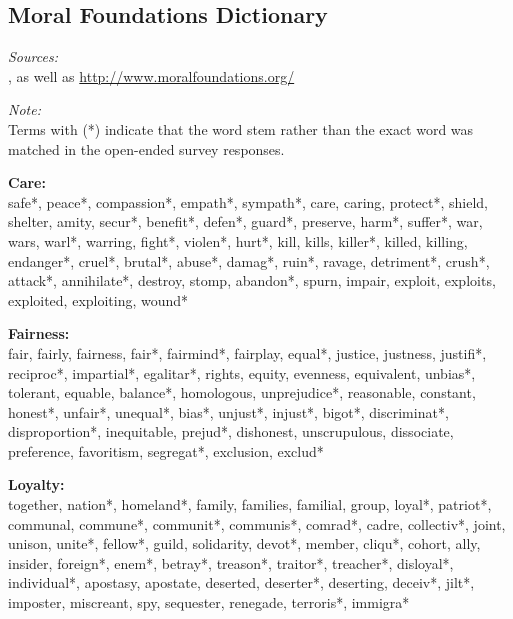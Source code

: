 \begin{flushleft}\footnotesize
\section{Moral Foundations Dictionary}\label{app:dict}
\textit{Sources:}\\
\citet{graham2009liberals}, as well as \url{http://www.moralfoundations.org/}
\vspace{.5cm}

\textit{Note:}\\
Terms with (*) indicate that the word stem rather than the exact word was matched in the open-ended survey responses.
\vspace{.5cm}

\textbf{Care:}\\
safe*, peace*, compassion*, empath*, sympath*, care, caring, protect*, shield, shelter, amity, secur*, benefit*, defen*, guard*, preserve, harm*, suffer*, war, wars, warl*, warring, fight*, violen*, hurt*, kill, kills, killer*, killed, killing, endanger*, cruel*, brutal*, abuse*, damag*, ruin*, ravage, detriment*, crush*, attack*, annihilate*, destroy, stomp, abandon*, spurn, impair, exploit, exploits, exploited, exploiting, wound*
\vspace{.5cm}

\textbf{Fairness:}\\
fair, fairly, fairness, fair*, fairmind*, fairplay, equal*, justice, justness, justifi*, reciproc*, impartial*, egalitar*, rights, equity, evenness, equivalent, unbias*, tolerant, equable, balance*, homologous, unprejudice*, reasonable, constant, honest*, unfair*, unequal*, bias*, unjust*, injust*, bigot*, discriminat*, disproportion*, inequitable, prejud*, dishonest, unscrupulous, dissociate, preference, favoritism, segregat*, exclusion, exclud*
\vspace{.5cm}

\textbf{Loyalty:}\\
together, nation*, homeland*, family, families, familial, group, loyal*, patriot*, communal, commune*, communit*, communis*, comrad*, cadre, collectiv*, joint, unison, unite*, fellow*, guild, solidarity, devot*, member, cliqu*, cohort, ally, insider, foreign*, enem*, betray*, treason*, traitor*, treacher*, disloyal*, individual*, apostasy, apostate, deserted, deserter*, deserting, deceiv*, jilt*, imposter, miscreant, spy, sequester, renegade, terroris*, immigra*
\vspace{.5cm}


\end{flushleft}
